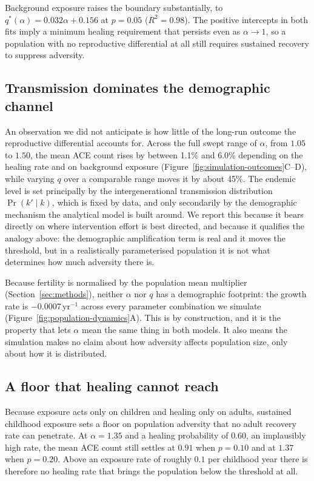 \documentclass{article}
\begin{document}
Background exposure raises the boundary substantially, to
\(q^*(\alpha) = 0.032\alpha + 0.156\) at \(p = 0.05\) (\(R^2 = 0.98\)).  The
positive intercepts in both fits imply a minimum healing requirement that
persists even as \(\alpha \to 1\), so a population with no reproductive
differential at all still requires sustained recovery to suppress adversity.

\subsection*{Transmission dominates the demographic channel}

An observation we did not anticipate is how little of the long-run outcome the
reproductive differential accounts for.  Across the full swept range of
\(\alpha\), from \(1.05\) to \(1.50\), the mean ACE count rises by between
1.1\% and 6.0\% depending on the healing rate and on background exposure
(Figure~\ref{fig:simulation-outcomes}C--D), while varying \(q\) over a
comparable range moves it by about 45\%.  The endemic level is set
principally by the intergenerational transmission distribution
\(\Pr(k' \mid k)\), which is fixed by data, and only secondarily by the
demographic mechanism the analytical model is built around.  We report this
because it bears directly on where intervention effort is best directed, and
because it qualifies the analogy above: the demographic amplification term is
real and it moves the threshold, but in a realistically parameterised
population it is not what determines how much adversity there is.

Because fertility is normalised by the population mean multiplier
(Section~\ref{sec:methods}), neither \(\alpha\) nor \(q\) has a demographic
footprint: the growth rate is \(-0.0007\,\mathrm{yr}^{-1}\) across every
parameter combination we simulate (Figure~\ref{fig:population-dynamics}A).
This is by construction, and it is the property that lets \(\alpha\) mean the
same thing in both models.  It also means the simulation makes no claim about
how adversity affects population size, only about how it is distributed.

\subsection*{A floor that healing cannot reach}

Because exposure acts only on children and healing only on adults, sustained
childhood exposure sets a floor on population adversity that no adult recovery
rate can penetrate.  At \(\alpha = 1.35\) and a healing probability of
\(0.60\), an implausibly high rate, the mean ACE count still settles at
\(0.91\) when \(p = 0.10\) and at \(1.37\) when \(p = 0.20\).  Above an
exposure rate of roughly \(0.1\) per childhood year there is therefore no
healing rate that brings the population below the threshold at all.
\end{document}

